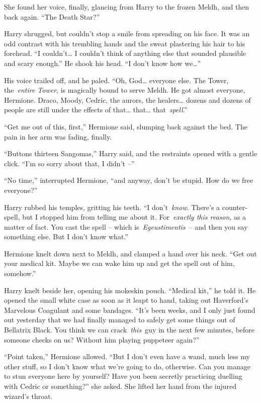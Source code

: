 She found her voice, finally, glancing from Harry to the frozen Meldh,
and then back again. ``The Death Star?''

Harry shrugged, but couldn't stop a smile from spreading on his face. It
was an odd contrast with his trembling hands and the sweat plastering
his hair to his forehead. ``I couldn't\ldots{} I couldn't think of
anything else that sounded plausible and scary enough.'' He shook his
head. ``I don't know how we\ldots{}''

His voice trailed off, and he paled. ``Oh, God\ldots{} everyone else.
The Tower, the~\emph{entire Tower}, is magically bound to serve Meldh.
He got almost everyone, Hermione. Draco, Moody, Cedric, the aurors, the
healers\ldots{} dozens and dozens of people are still under the effects
of that\ldots{} that\ldots{} that~\emph{spell}.''

``Get me out of this, first,'' Hermione said, slumping back against the
bed. The pain in her arm was fading, finally.

``Buttons thirteen Sangomas,'' Harry said, and the restraints opened
with a gentle click. ``I'm so sorry about that, I didn't --''

``No time,'' interrupted Hermione, ``and anyway, don't be stupid. How do
we free everyone?''

Harry rubbed his temples, gritting his teeth. ``I don't~\emph{know}.
There's a counter-spell, but I stopped him from telling me about it.
For~\emph{exactly this reason}, as a matter of fact. You cast the spell
-- which is~\emph{Egeustimentis}~-- and then you say something else. But
I don't know what.''

Hermione knelt down next to Meldh, and clamped a hand over his neck.
``Get out your medical kit. Maybe we can wake him up and get the spell
out of him, somehow.''

Harry knelt beside her, opening his mokeskin pouch. ``Medical kit,'' he
told it. He opened the small white case as soon as it leapt to hand,
taking out Haverford's Marvelous Coagulant and some bandages. ``It's
been weeks, and I only just found out yesterday that we had finally
managed to safely get some things out of Bellatrix Black. You think we
can crack~\emph{this}~guy in the next few minutes, before someone checks
on us? Without him playing puppeteer again?''

``Point taken,'' Hermione allowed. ``But I don't even have a wand, much
less my other stuff, so I don't know what we're going to do, otherwise.
Can you manage to stun everyone here by yourself? Have you been secretly
practicing duelling with Cedric or something?'' she asked. She lifted
her hand from the injured wizard's throat.

